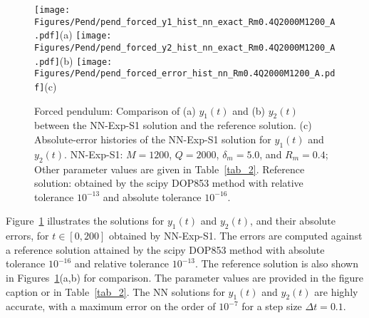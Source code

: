 \begin{figure}
  \centerline{
    \texttt{[image: Figures/Pend/pend\_forced\_y1\_hist\_nn\_exact\_Rm0.4Q2000M1200\_A.pdf]}(a)
    \texttt{[image: Figures/Pend/pend\_forced\_y2\_hist\_nn\_exact\_Rm0.4Q2000M1200\_A.pdf]}(b)
    \texttt{[image: Figures/Pend/pend\_forced\_error\_hist\_nn\_Rm0.4Q2000M1200\_A.pdf]}(c)
  }
  \caption{Forced pendulum: Comparison 
    of (a) $y_1(t)$ and (b) $y_2(t)$ between the NN-Exp-S1 solution and
    the reference solution. (c) Absolute-error histories of
    the NN-Exp-S1 solution for $y_1(t)$ and $y_2(t)$.
    NN-Exp-S1: $M=1200$, $Q=2000$, $\delta_m=5.0$,
    and $R_m=0.4$; Other parameter values are given in Table~\ref{tab_2}.
    Reference solution: obtained by the scipy DOP853 method with relative tolerance $10^{-13}$
    and absolute tolerance $10^{-16}$.
  }
  \label{fg_13}
\end{figure}

Figure~\ref{fg_13} illustrates the solutions for $y_1(t)$ and $y_2(t)$,
and their absolute errors, for $t\in[0,200]$ obtained by NN-Exp-S1.
The errors are computed against a reference solution attained by the scipy DOP853 method
with absolute tolerance $10^{-16}$ and  relative tolerance
$10^{-13}$. The reference solution is also shown in Figures~\ref{fg_13}(a,b) for comparison.
The parameter values  are provided in the figure
caption or in Table~\ref{tab_2}.
The NN solutions for $y_1(t)$ and $y_2(t)$  are highly accurate,
with a maximum error on the order
of $10^{-7}$ for a step size $\Delta t=0.1$.




